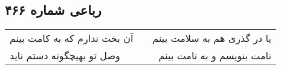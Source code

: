 \begin{center}
\section*{رباعی شماره ۴۶۶}
\label{sec:sh466}
\begin{longtable}{l p{0.5cm} r}
آن بخت ندارم که به کامت بینم
&&
یا در گذری هم به سلامت بینم
\\
وصل تو بهیچگونه دستم ناید
&&
نامت بنویسم و به نامت بینم
\\
\end{longtable}
\end{center}
